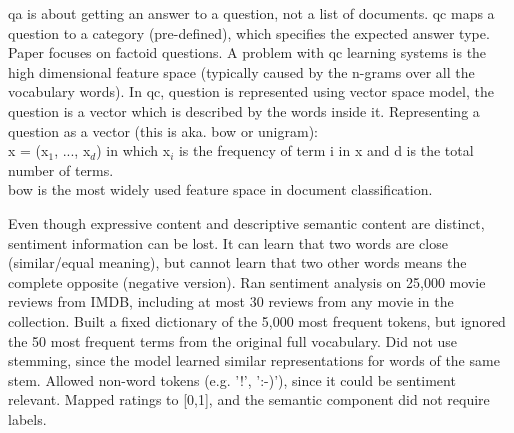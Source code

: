 \gls{qa} is about getting an answer to a question, not a list of documents.
\gls{qc} maps a question to a category (pre-defined), which specifies the expected answer type.
Paper focuses on factoid questions. 
A problem with \gls{qc} learning systems is the high dimensional feature space (typically caused by the n-grams over all the vocabulary words).
In \gls{qc}, question is represented using vector space model, the question is a vector which is described by the words inside it. 
Representing a question as a vector (this is aka. \gls{bow} or unigram): \\
x = (x$_{1}$, ..., x$_{d}$) in which x$_{i}$ is the frequency of term i in x and d is the total number of terms. \\
\gls{bow} is the most widely used feature space in document classification.
\cite{Loni2011}




Even though expressive content and descriptive semantic content are distinct, sentiment information can be lost. 
It can learn that two words are close (similar/equal meaning), but cannot learn that two other words means the complete opposite (negative version).
Ran sentiment analysis on 25,000 movie reviews from IMDB, including at most 30 reviews from any movie in the collection. 
Built a fixed dictionary of the 5,000 most frequent tokens, but ignored the 50 most frequent terms from the original full vocabulary. 
Did not use stemming, since the model learned similar representations for words of the same stem.
Allowed non-word tokens (e.g. '!', ':-)'), since it could be sentiment relevant. 
Mapped ratings to [0,1], and the semantic component did not require labels.
\cite{Maas2011}	



